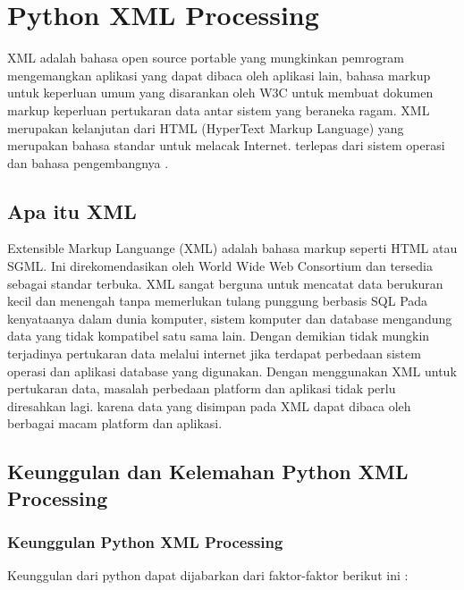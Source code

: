 

\section{Python XML Processing}
  XML adalah bahasa open source portable yang mungkinkan pemrogram mengemangkan aplikasi yang dapat dibaca oleh aplikasi lain, bahasa markup untuk keperluan umum yang disarankan oleh W3C untuk membuat dokumen markup keperluan pertukaran data antar sistem yang beraneka ragam. XML merupakan kelanjutan dari HTML (HyperText Markup Language) yang merupakan bahasa standar untuk melacak Internet.
terlepas dari sistem operasi dan bahasa pengembangnya .
\subsection{Apa itu XML}
  Extensible Markup Languange (XML) adalah bahasa markup seperti HTML atau SGML. 
Ini direkomendasikan oleh World Wide Web Consortium dan tersedia sebagai standar terbuka.
XML sangat berguna untuk mencatat data berukuran kecil dan menengah tanpa memerlukan tulang punggung berbasis SQL  
Pada kenyataanya dalam dunia komputer, sistem komputer dan database mengandung data yang tidak kompatibel satu sama lain. Dengan demikian tidak mungkin terjadinya pertukaran data melalui internet jika terdapat perbedaan sistem operasi dan aplikasi database yang digunakan.
Dengan menggunakan XML untuk pertukaran data, masalah perbedaan platform dan aplikasi tidak perlu diresahkan lagi. karena data yang disimpan pada XML dapat dibaca oleh berbagai macam platform dan aplikasi.

\subsection{Keunggulan dan Kelemahan Python XML Processing}
\subsubsection{Keunggulan Python XML Processing}
Keunggulan dari python dapat dijabarkan dari faktor-faktor berikut ini :

